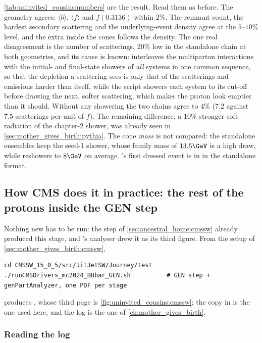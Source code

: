 \cref{tab:uninvited_cousins:numbers} are the result. Read them as before.
The geometry agrees: $\langle b\rangle$, $\langle f\rangle$ and $f(0.3136)$
within $2\%$. The remnant count, the hardest secondary scattering and the
underlying-event density agree at the $5$--$10\%$ level, and the extra \pt
inside the cones follows the density. The one real disagreement is the
number of scatterings, $20\%$ low in the standalone chain at both
geometries, and its cause is known: \PYTHIA interleaves the multiparton
interactions with the initial- and final-state showers of \emph{all}
systems in one common \pt sequence, so that the depletion a scattering sees
is only that of the scatterings and emissions harder than itself, while
the script showers each system to its cut-off before drawing the next,
softer scattering, which makes the proton look emptier than it should.
Without any showering the two chains agree to $4\%$ ($7.2$ against $7.5$
scatterings per unit of $f$). The remaining difference, a $10\%$ stronger
soft radiation of the chapter-2 shower, was already seen in
\cref{sec:mother_gives_birth:pythia}. The cone \emph{mass} is not compared:
the standalone ensembles keep the seed-1 shower, whose family mass of
$13.5\GeV$ is a high draw, while \PYTHIA reshowers to $8\GeV$ on average.
\PYTHIA's first dressed event is in
 in the standalone format.

\subsection{How CMS does it in practice: the rest of the protons inside the GEN step}
\label{sec:uninvited_cousins:cmssw}

Nothing new has to be run: the  step of
\cref{sec:ancestral_home:cmssw} already produced this stage, and
's analyser drew it as its third figure. From the setup of
\cref{sec:mother_gives_birth:cmssw},
\begin{verbatim}
cd CMSSW_15_0_5/src/JitJetSW/Journey/test
./runCMSDrivers_mc2024_BBbar_GEN.sh          # GEN step + genPartAnalyzer, one PDF per stage
\end{verbatim}
produces , whose third page is
\cref{fig:uninvited_cousins:cmssw}; the copy in 
is the one used here, and the log is the one of \cref{ch:mother_gives_birth}.

\subsubsection{Reading the log}

